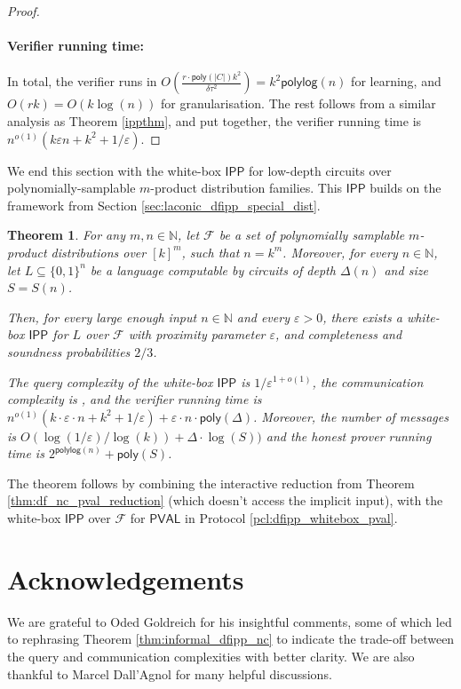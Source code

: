 \documentclass[11pt]{article}
\newtheorem{theorem}{Theorem}[section]
\newcommand{\poly}{\mathsf{poly}}
\newcommand{\polylog}{\mathsf{polylog}}
\newcommand{\PVAL}{\mathsf{PVAL}}
\newcommand{\IPP}{\mathsf{IPP}}
\newcommand{\N}{\mathbb{N}}
\newcommand{\sF}{\mathcal{F}}
\begin{document}
\begin{proof}
\paragraph*{Verifier running time:} In total, the verifier runs in $O\left(\frac{r \cdot \poly(|C|)k^{2}}{\delta\tau^{2}}\right)= k^{2}\polylog (n)$ for learning, and $O(rk)=O(k\log (n))$ for granularisation. The rest follows from a similar analysis as Theorem \ref{ippthm}, and put together, the verifier running time is $n^{o(1)}(k\varepsilon n +k^{2}+ 1/\varepsilon)$.
\end{proof}

We end this section with the white-box $\IPP$ for low-depth circuits over polynomially-samplable $m$-product distribution families. This $\IPP$ builds on the framework from Section \ref{sec:laconic_dfipp_special_dist}.
\begin{theorem}
    \label{thm:dfipp_product_whitebox}
    For any $m,n \in \N$, let $\sF$ be a set of polynomially samplable $m$-product distributions over $[k]^m$, such that $n = k^m$. Moreover, for every $n \in \N$, let $L \subseteq \{0,1\}^{n}$ be a language computable by circuits of depth $\Delta(n)$ and size $S=S(n)$. 
    
    Then, for every large enough input $n \in \N$ and every $\varepsilon > 0$, there exists a white-box $\IPP$ for $L$ over $\sF$ with proximity parameter $\varepsilon$, and completeness and soundness probabilities $2/3$.
    
    The query complexity of the white-box $\IPP$ is $1/\varepsilon^{1+o(1)}$, the communication complexity is \sloppy{$\polylog(n) \cdot \left(k^{2}+k\cdot\varepsilon^{1-o(1)}\cdot n \right)+\varepsilon\cdot n\cdot \poly(\Delta)$}, and the verifier running time is $n^{o(1)}(k\cdot\varepsilon\cdot n +k^{2}+ 1/\varepsilon)+\varepsilon \cdot n\cdot\poly(\Delta)$. Moreover, the number of messages is $O(\log(1/\varepsilon)/\log(k))+\Delta \cdot \log(S))$ and the honest prover running time is $2^{\polylog(n)}+\poly(S)$.
\end{theorem}

The theorem follows by combining the interactive reduction from Theorem \ref{thm:df_nc_pval_reduction} (which doesn't access the implicit input), with the white-box $\IPP$ over $\sF$ for $\PVAL$ in Protocol \ref{pcl:dfipp_whitebox_pval}.


\section*{Acknowledgements}
We are grateful to Oded Goldreich for his insightful comments, some of which led to rephrasing Theorem \ref{thm:informal_dfipp_nc} to indicate the trade-off between the query and communication complexities with better clarity. We are also thankful to Marcel Dall'Agnol for many helpful discussions.
\end{document}
